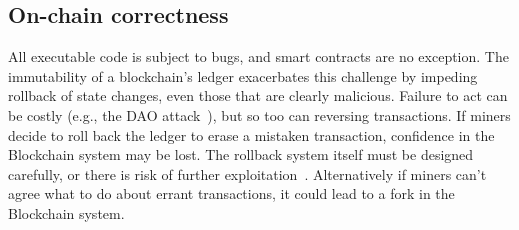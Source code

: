 
\subsection{On-chain correctness}

All executable code is subject to bugs, and smart contracts are no exception.
The immutability of a blockchain's ledger exacerbates this challenge by impeding rollback of state changes, even those that are clearly malicious.
Failure to act can be costly (e.g., the DAO attack~\cite{dao}), but so too can reversing transactions.
If miners decide to roll back the ledger to erase a mistaken transaction,  
confidence in the Blockchain system may be lost. The rollback system itself 
must be designed carefully, or there is risk of further 
exploitation~\cite{arxiv:AviSafSha18}.
Alternatively if miners can't agree what to do about errant transactions, it 
could lead to a fork in the Blockchain system.


